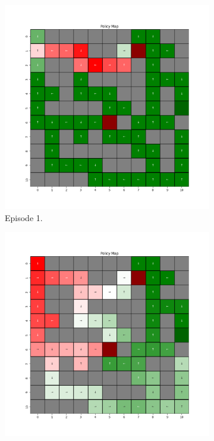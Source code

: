 \documentclass{assignment}
\begin{document}
\begin{figure}[H]
    \begin{subfigure}{0.3\textwidth}
        \includegraphics[width=\textwidth]{figures/policy_q/epsilon_sweep/policy_alpha_0.1_gamma_0.95_epsilon_0.5_iteration_1.png}
    \caption{Episode 1.}
    \end{subfigure}\hfill
    \begin{subfigure}{0.3\textwidth}
        \includegraphics[width=\textwidth]{figures/policy_q/epsilon_sweep/policy_alpha_0.1_gamma_0.95_epsilon_0.5_iteration_50.png}

\end{subfigure}
\end{figure}
\end{document}
